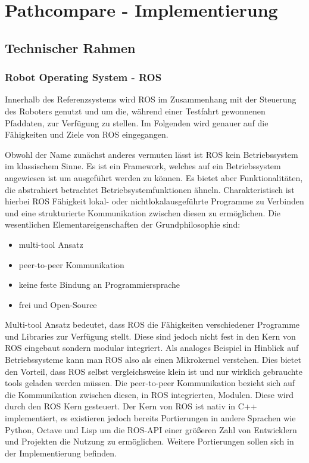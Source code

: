 \chapter{Pathcompare - Implementierung}
\label{sec:implementierung}
\section{Technischer Rahmen}

\subsection{Robot Operating System - ROS}

Innerhalb des Referenzsystems wird \gls{ROS} im Zusammenhang mit der
Steuerung des Roboters genutzt und um die, während einer Testfahrt gewonnenen Pfaddaten,
zur Verfügung zu stellen. Im Folgenden wird genauer auf die Fähigkeiten und
Ziele von \gls{ROS} eingegangen.

Obwohl der Name zunächst anderes vermuten lässt ist \gls{ROS} kein Betriebssystem im
klassischem Sinne. Es ist ein Framework, welches auf ein Betriebssystem
angewiesen ist um ausgeführt werden zu können. Es bietet aber Funktionalitäten,
die abstrahiert betrachtet Betriebsystemfunktionen ähneln. Charakteristisch ist
hierbei \gls{ROS} Fähigkeit lokal- oder nichtlokalausgeführte Programme zu Verbinden und
eine strukturierte Kommunikation zwischen diesen zu ermöglichen. Die
wesentlichen Elementareigenschaften der Grundphilosophie sind:

\begin{itemize}
  \item multi-tool Ansatz
  \item peer-to-peer Kommunikation
  \item keine feste Bindung an Programmiersprache
  \item frei und Open-Source
\end{itemize}

Multi-tool Ansatz bedeutet, dass \gls{ROS} die Fähigkeiten verschiedener
Programme und Libraries zur Verfügung stellt. Diese sind jedoch nicht fest in
den Kern von \gls{ROS} eingebaut sondern modular integriert. Als analoges Beispiel in
Hinblick auf Betriebssysteme kann man \gls{ROS} also als einen Mikrokernel
verstehen. Dies bietet den Vorteil, dass \gls{ROS} selbst vergleichsweise klein
ist und nur wirklich gebrauchte tools geladen werden müssen.
Die peer-to-peer Kommunikation bezieht sich auf die Kommunikation
zwischen diesen, in \gls{ROS} integrierten, Modulen. Diese wird durch den \gls{ROS}
Kern gesteuert. Der Kern von \gls{ROS} ist nativ in C++ implementiert, es
existieren jedoch bereits Portierungen in andere Sprachen wie Python, Octave
und Lisp um die \gls{ROS}-\gls{API} einer größeren Zahl von Entwicklern und
Projekten die Nutzung zu ermöglichen. Weitere Portierungen sollen sich in der Implementierung befinden.

